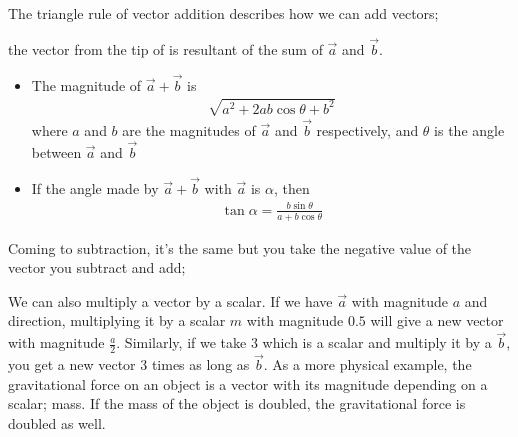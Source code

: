 \begin{phybox}{}
{The triangle rule of vector addition describes how we can add vectors;
\begin{center}
\end{center}
the vector from the tip of is resultant of the sum of $\Vec{a}$ and $\Vec{b}$.
\begin{itemize}
    \item{The magnitude of $\Vec{a} + \Vec{b}$ is 
    \begin{align*}
        \sqrt{a^2 + 2ab \cos\theta + b^2}
    \end{align*} where $a$ and $b$ are the magnitudes of $\Vec{a}$ and $\Vec{b}$ respectively, and $\theta$ is the angle between $\Vec{a}$ and $\Vec{b}$}
    \item{If the angle made by $\Vec{a} + \Vec{b}$ with $\Vec{a}$ is $\alpha$, then \begin{align*}
        \tan\alpha = \frac{b \sin \theta}{a + b \cos\theta}
    \end{align*}}
\end{itemize}
Coming to subtraction, it's the same but you take the negative value of the vector you subtract and add;
\begin{center}
\end{center}
We can also multiply a vector by a scalar. If we have $\Vec{a}$ with magnitude $a$ and direction, multiplying it by a scalar $m$ with magnitude $0.5$ will give a new vector with magnitude $\frac{a}{2}$. Similarly, if we take 3 which is a scalar and multiply it by a $\Vec{b}$, you get a new vector 3 times as long as $\Vec{b}$. As a more physical example, the gravitational force on an object is a vector with its magnitude depending on a scalar; mass. If the mass of the object is doubled, the gravitational force is doubled as well.
}
\end{phybox}
